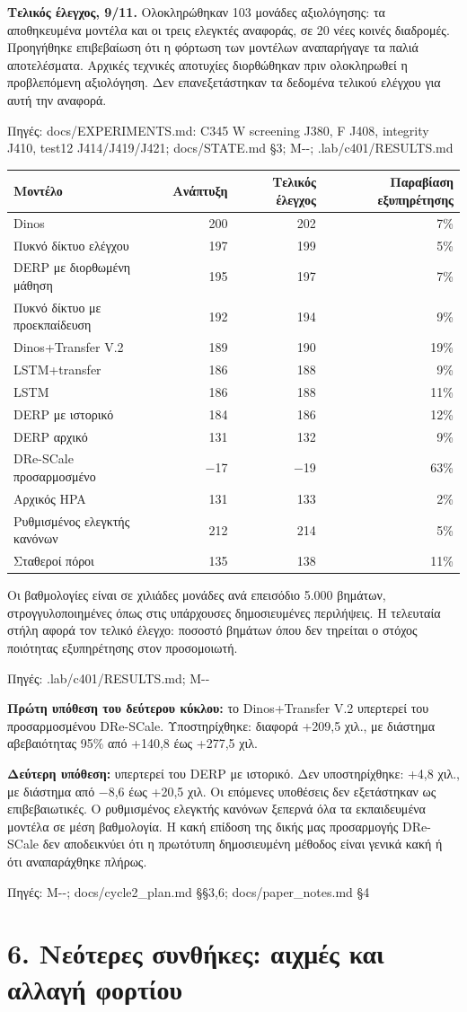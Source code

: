 \documentclass[10pt,a4paper]{article}
\newcommand{\src}[1]{\par{\scriptsize\color{gray}Πηγές: {\ttfamily #1}}\par}
\newcommand{\page}[1]{\clearpage\section*{#1}}
\begin{document}
\textbf{Τελικός έλεγχος, 9/11.} Ολοκληρώθηκαν 103 μονάδες αξιολόγησης: τα αποθηκευμένα μοντέλα και οι τρεις ελεγκτές αναφοράς, σε 20 νέες κοινές διαδρομές. Προηγήθηκε επιβεβαίωση ότι η φόρτωση των μοντέλων αναπαρήγαγε τα παλιά αποτελέσματα. Αρχικές τεχνικές αποτυχίες διορθώθηκαν πριν ολοκληρωθεί η προβλεπόμενη αξιολόγηση. Δεν επανεξετάστηκαν τα δεδομένα τελικού ελέγχου για αυτή την αναφορά.
\src{docs/\allowbreak EXPERIMENTS.md: C345 W screening J380, F J408, integrity J410, test12 J414/\allowbreak J419/\allowbreak J421; docs/\allowbreak STATE.md §3; M-\allowbreak 20261109-\allowbreak 040; .lab/\allowbreak c401/\allowbreak RESULTS.md}
\begin{center}\begin{tabular}{lrrr}\toprule
Μοντέλο & Ανάπτυξη & Τελικός έλεγχος & Παραβίαση εξυπηρέτησης\\\midrule
Dinos &200&202&7\%\\
Πυκνό δίκτυο ελέγχου &197&199&5\%\\
DERP με διορθωμένη μάθηση &195&197&7\%\\
Πυκνό δίκτυο με προεκπαίδευση &192&194&9\%\\
Dinos+Transfer V.2 &189&190&19\%\\
LSTM+transfer &186&188&9\%\\
LSTM &186&188&11\%\\
DERP με ιστορικό &184&186&12\%\\
DERP αρχικό &131&132&9\%\\
DRe-SCale προσαρμοσμένο &−17&−19&63\%\\\midrule
Αρχικός HPA &131&133&2\%\\
Ρυθμισμένος ελεγκτής κανόνων &212&214&5\%\\
Σταθεροί πόροι &135&138&11\%\\\bottomrule
\end{tabular}\end{center}
Οι βαθμολογίες είναι σε χιλιάδες μονάδες ανά επεισόδιο 5.000 βημάτων, στρογγυλοποιημένες όπως στις υπάρχουσες δημοσιευμένες περιλήψεις. Η τελευταία στήλη αφορά τον τελικό έλεγχο: ποσοστό βημάτων όπου δεν τηρείται ο στόχος ποιότητας εξυπηρέτησης στον προσομοιωτή.
\src{.lab/\allowbreak c401/\allowbreak RESULTS.md; M-\allowbreak 20261109-\allowbreak 040}
\textbf{Πρώτη υπόθεση του δεύτερου κύκλου:} το Dinos+Transfer V.2 υπερτερεί του προσαρμοσμένου DRe-SCale. Υποστηρίχθηκε: διαφορά +209,5 χιλ., με διάστημα αβεβαιότητας 95\% από +140,8 έως +277,5 χιλ.

\textbf{Δεύτερη υπόθεση:} υπερτερεί του DERP με ιστορικό. Δεν υποστηρίχθηκε: +4,8 χιλ., με διάστημα από −8,6 έως +20,5 χιλ. Οι επόμενες υποθέσεις δεν εξετάστηκαν ως επιβεβαιωτικές. Ο ρυθμισμένος ελεγκτής κανόνων ξεπερνά όλα τα εκπαιδευμένα μοντέλα σε μέση βαθμολογία. Η κακή επίδοση της δικής μας προσαρμογής DRe-SCale δεν αποδεικνύει ότι η πρωτότυπη δημοσιευμένη μέθοδος είναι γενικά κακή ή ότι αναπαράχθηκε πλήρως.
\src{M--; docs/\allowbreak cycle2\_plan.md §§3,6; docs/\allowbreak paper\_notes.md §4}
\page{6. Νεότερες συνθήκες: αιχμές και αλλαγή φορτίου}
\end{document}
